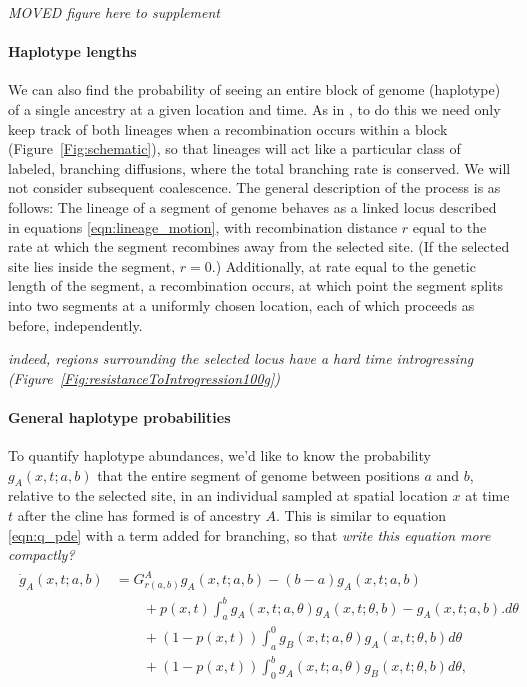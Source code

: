 \documentclass[12pt]{article}
\newcommand{\alisa}[1]{{\em \color{red} #1}}
\newcommand{\plr}[1]{{\em \color{blue} #1}}
\begin{document}
\alisa{MOVED figure here to supplement}

\paragraph{Haplotype lengths}
We can also find the probability of seeing an entire block of genome (haplotype)
of a single ancestry at a given location and time.
As in \citet{Sedghifar2015},
to do this we need only keep track of both lineages when a recombination occurs within a block (Figure~\ref{Fig:schematic}),
so that lineages will act like a particular class of labeled, branching diffusions,
where the total branching rate is conserved. We will not consider subsequent coalescence.
The general description of the process is as follows:
The lineage of a segment of genome behaves as a linked locus described in equations \eqref{eqn:lineage_motion},
with recombination distance $r$ equal to the rate at which the segment recombines away from the selected site.
(If the selected site lies inside the segment, $r=0$.)
Additionally, at rate equal to the genetic length of the segment,
a recombination occurs, at which point the segment splits into two segments at a uniformly chosen location,
each of which proceeds as before, independently.


\alisa{indeed, regions surrounding the selected locus have a hard time introgressing (Figure~\ref{Fig:resistanceToIntrogression100g})}

\paragraph{General haplotype probabilities}
To quantify haplotype abundances,
we'd like to know the probability $g_A(x,t;a,b)$ that the entire segment of genome between positions $a$ and $b$, relative to the selected site,
in an individual sampled at spatial location $x$ at time $t$ after the cline has formed is of ancestry $A$.
This is similar to equation \eqref{eqn:q_pde} with a term added for branching, so that 
\plr{write this equation more compactly?}
\begin{align}
    \begin{aligned} \label{eqn:g_pde}
        \dot g_A(x,t;a,b) 
            &= G_{r(a,b)}^A g_A(x,t;a,b) 
            - (b-a) g_A(x,t;a,b) 
            \\ {} & \qquad 
            + p(x,t) \int_a^b {
                g_A(x,t;a,\theta) g_A(x,t;\theta,b) 
                - g_A(x,t;a,b) .
            } d\theta
            \\ {} & \qquad 
            + (1-p(x,t)) \int_a^0 {
                g_B(x,t;a,\theta) g_A(x,t;\theta,b)
            } d\theta
            \\ {} & \qquad 
            + (1-p(x,t)) \int_0^b {
                g_A(x,t;a,\theta) g_B(x,t;\theta,b)
            } d\theta,
    \end{aligned}
\end{align}
\end{document}
